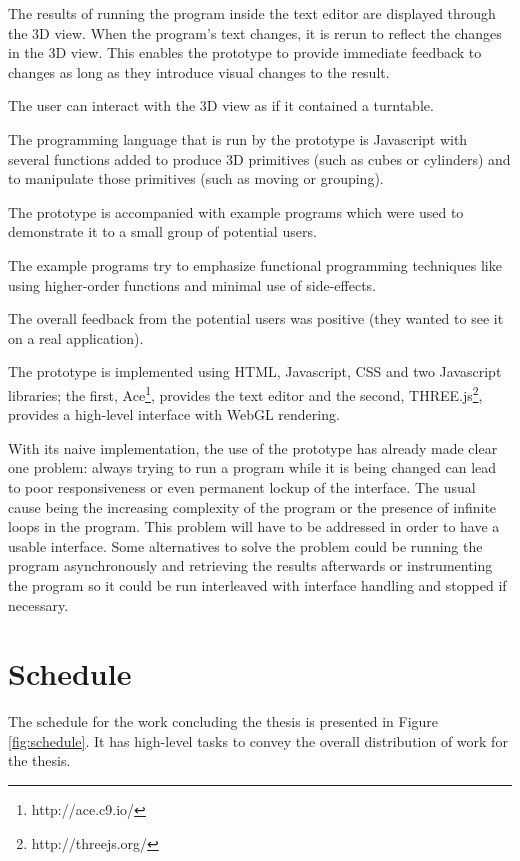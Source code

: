 \documentclass{./llncs2e/llncs}
\begin{document}
	The results of running the program inside the text editor are displayed through the 3D view. 
	When the program's text changes, it is rerun to reflect the changes in the 3D view. 
	This enables the prototype to provide immediate feedback to changes as long as they introduce visual changes to the result.

	The user can interact with the 3D view as if it contained a turntable.

	The programming language that is run by the prototype is Javascript with several functions added to produce 3D primitives (such as cubes or cylinders) and to manipulate those primitives (such as moving or grouping).

	The prototype is accompanied with example programs which were used to demonstrate it to a small group of potential users.

	The example programs try to emphasize functional programming techniques like using higher-order functions and minimal use of side-effects.

	The overall feedback from the potential users was positive (they wanted to see it on a real application).

	The prototype is implemented using HTML, Javascript, CSS and two Javascript libraries; the first, Ace\footnote{http://ace.c9.io/}, provides the text editor and the second, THREE.js\footnote{http://threejs.org/}, provides a high-level interface with WebGL rendering.

	With its naive implementation, the use of the prototype has already made clear one problem: always trying to run a program while it is being changed can lead to poor responsiveness or even permanent lockup of the interface.
	The usual cause being the increasing complexity of the program or the presence of infinite loops in the program. 
	This problem will have to be addressed in order to have a usable interface. 
	Some alternatives to solve the problem could be running the program asynchronously and retrieving the results afterwards or instrumenting the program so it could be run interleaved with interface handling and stopped if necessary.

\section{Schedule}
	The schedule for the work concluding the thesis is presented in Figure \ref{fig:schedule}.
	It has high-level tasks to convey the overall distribution of work for the thesis.
	
\end{document}
